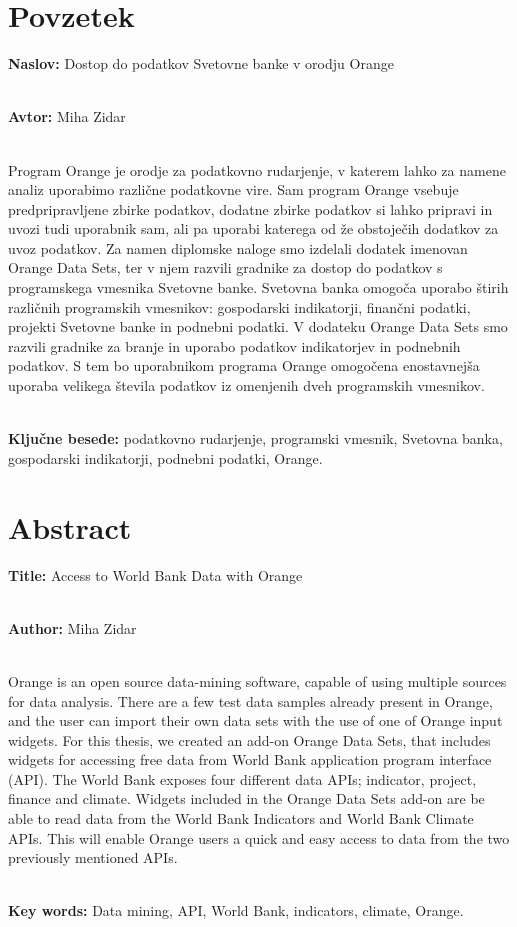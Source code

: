 \chapter*{Povzetek}


\textbf{Naslov:} Dostop do podatkov Svetovne banke v orodju Orange

\ \\
\textbf{Avtor:} Miha Zidar

\ \\
Program Orange je orodje za podatkovno rudarjenje, v katerem
lahko za namene analiz uporabimo različne podatkovne vire. Sam program Orange
vsebuje predpripravljene zbirke podatkov, dodatne zbirke podatkov si lahko 
pripravi in uvozi tudi uporabnik sam, ali pa uporabi katerega od že obstoječih
dodatkov za uvoz podatkov. Za namen diplomske naloge smo izdelali dodatek imenovan
Orange Data Sets, ter v njem razvili gradnike za dostop do podatkov s programskega 
vmesnika Svetovne banke. Svetovna banka omogoča uporabo štirih 
različnih programskih vmesnikov: gospodarski indikatorji, finančni podatki,
projekti Svetovne banke in podnebni podatki. V dodateku Orange Data Sets smo
razvili gradnike za branje in uporabo podatkov indikatorjev 
in podnebnih podatkov.
S tem bo uporabnikom programa Orange omogočena enostavnejša uporaba velikega števila
podatkov iz omenjenih dveh programskih vmesnikov.

\ \\
\textbf{Ključne besede:} podatkovno rudarjenje, programski vmesnik, 
Svetovna banka, gospodarski indikatorji, podnebni podatki, Orange. 




\clearemptydoublepage

\chapter*{Abstract}


\textbf{Title:} Access to World Bank Data with Orange

\ \\
\textbf{Author:} Miha Zidar

\ \\
Orange is an open source data-mining software, capable of using multiple sources for data analysis. There are a few test data samples already present in Orange, and the user can import their own data sets with the use of one of Orange input widgets. For this thesis, we created an add-on Orange Data Sets, that includes widgets for accessing free data from World Bank application program interface (API). The World Bank exposes four different data APIs; indicator, project, finance and climate. Widgets included in the Orange Data Sets add-on are be able to read data from the World Bank Indicators and World Bank Climate APIs.
This will enable Orange users a quick and easy access to data from the two previously mentioned APIs.

\ \\
\textbf{Key words:} Data mining, API, World Bank, indicators, climate, Orange.

